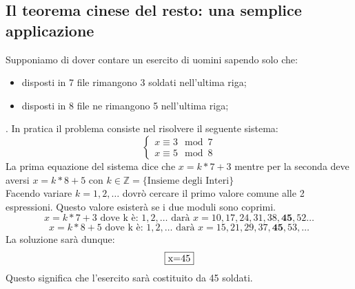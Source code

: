 \documentclass[10pt,a4paper]{article}
\begin{document}
\subsection{Il teorema cinese del resto: una semplice applicazione}
Supponiamo di dover contare un esercito di uomini sapendo solo che:
\begin{itemize}
	\item disposti in 7 file rimangono 3 soldati  nell'ultima riga;
	\item disposti in 8 file ne rimangono 5 nell'ultima riga;
\end{itemize}
. In pratica il problema consiste nel risolvere il seguente sistema:
\[ 
\left\{
\begin{array}{rl}
 x\equiv 3 \mod 7\\
 x\equiv 5 \mod 8 
\end{array}
\right.
 \] 
La prima equazione del sistema dice che $ x=k*7+3 $ mentre per la seconda deve aversi $ x=k*8+5 $ con $ k \in \mathbb{Z}=\{\mbox{Insieme degli Interi}\} $\\ Facendo variare $ k=1,2,\dots  $ dovrò cercare il primo valore comune alle 2 espressioni. Questo valore esisterà se i due moduli sono coprimi.
\[ x=k*7+3 \mbox{ dove k è: }1,2,\dots \mbox{ darà } x=10,17,24,31,38,\mathbf{45},52 \dots \]
\[ x=k*8+5 \mbox{ dove k è: }1,2,\dots \mbox{ darà } x=15,21,29,37,\mathbf{45},53,\dots \]  
La soluzione sarà dunque:\[ \fbox{x=45}  \]
Questo significa che l'esercito sarà costituito da 45 soldati.
\pagebreak
\end{document}
